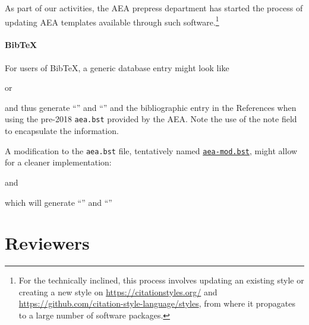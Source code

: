 \documentclass[AEJ]{AEA}
\begin{document}
As part of our activities, the AEA prepress department has started the process of updating AEA templates available through such software.\footnote{For the technically inclined, this process involves updating an existing style or creating a new style on \url{https://citationstyles.org/} and \url{https://github.com/citation-style-language/styles}, from where it propagates to a large number of software packages.}  

\paragraph{BibTeX}
For users of BibTeX, a generic database entry might look like
\lstset{language=}

%
or

%
and thus generate ``\cite{duflopande2006}'' and ``\cite{leiss1999}'' and the bibliographic entry in the References when using the pre-2018 \texttt{aea.bst} provided by the \ac{AEA}. Note the use of the note field to encapsulate the information.

A modification to the \texttt{aea.bst} file, tentatively named \href{aea-mod.bst}{\texttt{aea-mod.bst}}, might allow for a cleaner implementation: 

and

which will generate ``\cite{duflopande2006-new}'' and ``\cite{leiss1999-new}''





\section{Reviewers}
\end{document}
